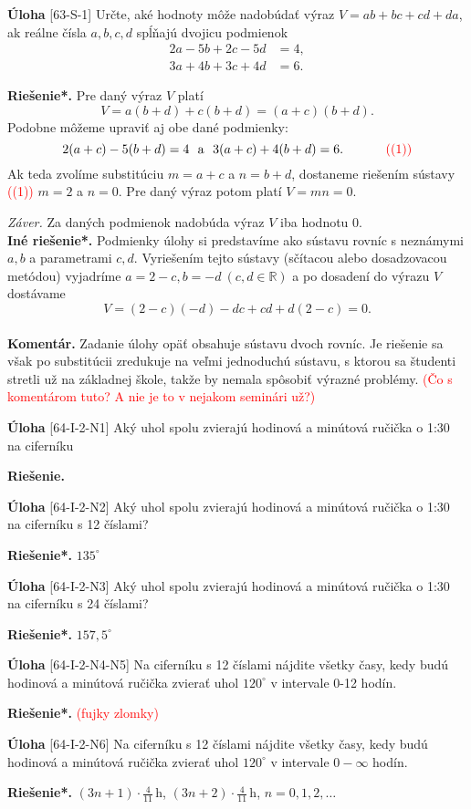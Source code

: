 \documentclass{article}
\newcommand{\RR}{\mathbb{R}}
\newcommand{\kom}{\textbf{Komentár.} }
\newcommand{\rie}{\textbf{Riešenie.} }
\newcommand{\rieh}{\textbf{Riešenie*.} }
\newcommand\todo[1]{\noindent\textcolor{red}{(#1)}}
\newcommand{\problem}[3]{
  \begin{tcolorbox}[breakable,notitle,boxrule=0pt,colback=light-gray,colframe=light-gray]
    \textbf{Úloha}
    [#1] #2
  \end{tcolorbox}
  \noindent#3
}
\begin{document}
\problem{63-S-1}{
Určte, aké hodnoty môže nadobúdať výraz $V = ab + bc + cd + da$, ak reálne čísla $a,b, c, d$ spĺňajú dvojicu podmienok
\begin{align*}
2a - 5b + 2c - 5d &= 4,\\
3a + 4b + 3c + 4d &= 6.
\end{align*}
}{
\rieh Pre daný výraz $V$ platí $$V = a(b + d) + c(b + d) = (a + c)(b + d).$$
Podobne môžeme upraviť aj obe dané podmienky: $$2(a + c) - 5(b + d) = 4 \ \ \mathrm{a} \ \  3(a + c) + 4(b + d) = 6.\ \ \  \ \ \ \ \ \ \ \todo{(1)}$$
Ak teda zvolíme substitúciu $m = a + c$ a $n = b + d$, dostaneme riešením sústavy \todo{(1)} $m = 2$ a $n = 0$. Pre daný výraz potom platí $V = mn = 0$.

\textit{Záver.} Za daných podmienok nadobúda výraz $V$ iba hodnotu 0.\\

\textbf{Iné riešenie*.} Podmienky úlohy si predstavíme ako sústavu rovníc s neznámymi $a, b$ a parametrami $c, d$. Vyriešením tejto sústavy (sčítacou alebo dosadzovacou metódou) vyjadríme $a = 2 - c, b = -d \ (c, d \in \RR )$ a po dosadení do výrazu $V$ dostávame $$V = (2 - c)(-d) - dc + cd + d(2 - c) = 0.$$
\\
\kom Zadanie úlohy opäť obsahuje sústavu dvoch rovníc. Je riešenie sa však po substitúcii zredukuje na veľmi jednoduchú sústavu, s ktorou sa študenti stretli už na základnej škole, takže by nemala spôsobiť výrazné problémy. 
\todo{Čo s komentárom tuto? A nie je to v nejakom seminári už?}
}


\problem{64-I-2-N1}{
Aký uhol spolu zvierajú hodinová a minútová ručička o 1:30 na ciferníku
}{
\rie 
}

\problem{64-I-2-N2}{
Aký uhol spolu zvierajú hodinová a minútová ručička o 1:30 na ciferníku s 12 číslami?
}{
\rieh $135^{\circ}$
}

\problem{64-I-2-N3}{
Aký uhol spolu zvierajú hodinová a minútová ručička o 1:30 na ciferníku s 24 číslami? 
}{
\rieh $157,5^{\circ}$
}


\problem{64-I-2-N4-N5}{
Na ciferníku s 12 číslami nájdite všetky časy, kedy budú hodinová a minútová ručička zvierať uhol $120^{\circ}$ v intervale 0-12 hodín.
}{
\rieh \todo{fujky zlomky}
}

\problem{64-I-2-N6}{
Na ciferníku s 12 číslami nájdite všetky časy, kedy budú hodinová a minútová ručička zvierať uhol $120^{\circ}$ v intervale $0-\infty$ hodín.
}{
\rieh $(3n+1) \cdot \frac{4}{11}$\,h, $(3n+2)\cdot\frac{4}{11}$\,h, $n=0, 1, 2, \ldots$
}
\end{document}
